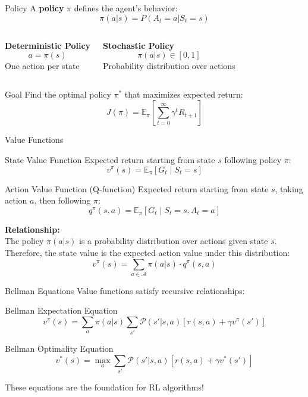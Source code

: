 \documentclass[aspectratio=169,10pt]{beamer}
\begin{document}
\begin{frame}{Policy}
A \textbf{policy} $\pi$ defines the agent's behavior:
$$\pi(a|s) = P(A_t = a | S_t = s)$$

\begin{columns}
\textbf{Deterministic Policy}
$$a = \pi(s)$$
One action per state

\textbf{Stochastic Policy}
$$\pi(a|s) \in [0,1]$$
Probability distribution over actions
\end{columns}

\begin{block}{Goal}
Find the optimal policy $\pi^*$ that maximizes expected return:
$$J(\pi) = \mathbb{E}_{\pi}\left[\sum_{t=0}^{\infty} \gamma^t R_{t+1}\right]$$
\end{block}
\end{frame}

\begin{frame}{Value Functions}
\begin{block}{State Value Function}
Expected return starting from state $s$ following policy $\pi$:
$$v^{\pi}(s) = \mathbb{E}_{\pi}[G_t \mid S_t = s]$$
\end{block}

\begin{block}{Action Value Function (Q-function)}
Expected return starting from state $s$, taking action $a$, then following $\pi$:
$$q^{\pi}(s,a) = \mathbb{E}_{\pi}[G_t \mid S_t = s, A_t = a]$$
\end{block}

\textbf{Relationship:} \\
The policy $\pi(a|s)$ is a probability distribution over actions given state $s$. 
Therefore, the state value is the expected action value under this distribution:
$$v^{\pi}(s) = \sum_{a \in \mathcal{A}} \pi(a|s) \cdot q^{\pi}(s,a)$$
\end{frame}

\begin{frame}{Bellman Equations}
Value functions satisfy recursive relationships:

\begin{block}{Bellman Expectation Equation}
$$v^{\pi}(s) = \sum_a \pi(a|s) \sum_{s'} \mathcal{P}(s'|s,a)[r(s,a) + \gamma v^{\pi}(s')]$$
\end{block}

\begin{block}{Bellman Optimality Equation}
$$v^*(s) = \max_a \sum_{s'} \mathcal{P}(s'|s,a)[r(s,a) + \gamma v^*(s')]$$
\end{block}

These equations are the foundation for RL algorithms!
\end{frame}
\end{document}
